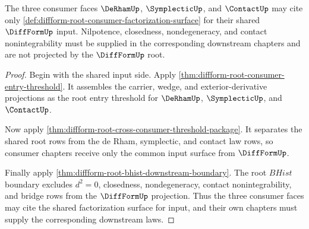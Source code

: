 \begin{theorem}
\label{thm:diffform-root-consumer-factorization-threshold}
The three consumer faces $\DeRhamUp$, $\SymplecticUp$, and $\ContactUp$ may
cite only \autoref{def:diffform-root-consumer-factorization-surface} for
their shared $\DiffFormUp$ input. Nilpotence, closedness, nondegeneracy, and
contact nonintegrability must be supplied in the corresponding downstream
chapters and are not projected by the $\DiffFormUp$ root.
\end{theorem}
\begin{proof}
Begin with the shared input side. Apply
\autoref{thm:diffform-root-consumer-entry-threshold}. It assembles the
carrier, wedge, and exterior-derivative projections as the root entry
threshold for $\DeRhamUp$, $\SymplecticUp$, and $\ContactUp$.

Now apply
\autoref{thm:diffform-root-cross-consumer-threshold-package}. It separates
the shared root rows from the de Rham, symplectic, and contact law rows, so
consumer chapters receive only the common input surface from $\DiffFormUp$.

Finally apply \autoref{thm:diffform-root-bhist-downstream-boundary}. The root
$BHist$ boundary excludes $d^2=0$, closedness, nondegeneracy, contact
nonintegrability, and bridge rows from the $\DiffFormUp$ projection. Thus the
three consumer faces may cite the shared factorization surface for input, and
their own chapters must supply the corresponding downstream laws.
\end{proof}
